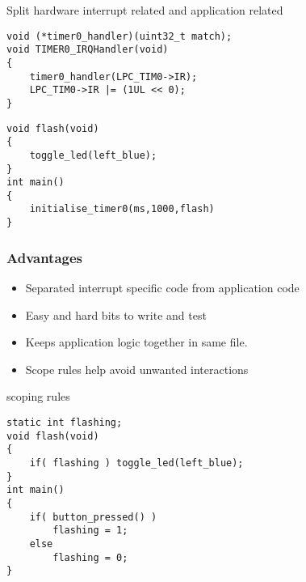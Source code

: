 \documentclass[svgnames,x11names]{beamer}
\begin{document}
\begin{frame}[fragile]{Split hardware interrupt related and
    application related}
  \begin{exampleblock}{}
\begin{verbatim}
void (*timer0_handler)(uint32_t match);
void TIMER0_IRQHandler(void)
{
	timer0_handler(LPC_TIM0->IR);
	LPC_TIM0->IR |= (1UL << 0);
}

\end{verbatim}
  \end{exampleblock}
  \begin{exampleblock}{}
\begin{verbatim}
void flash(void)
{
	toggle_led(left_blue);
}
int main()
{
	initialise_timer0(ms,1000,flash)
}
\end{verbatim}
  \end{exampleblock}
  
\end{frame}

\begin{frame}
  \frametitle{Advantages}
  \begin{itemize}
  \item Separated interrupt specific code from application code
  \item Easy and hard bits to write and test
  \item Keeps application logic together in same file.
  \item Scope rules help avoid unwanted interactions
  \end{itemize}
\end{frame}


\begin{frame}[fragile]
  \begin{block}{scoping rules}
\begin{verbatim}
static int flashing;
void flash(void)
{
	if( flashing ) toggle_led(left_blue);
}
int main()
{
	if( button_pressed() )
		flashing = 1;
	else
		flashing = 0;
}
\end{verbatim}
  \end{block}
\end{frame}

\end{document}
